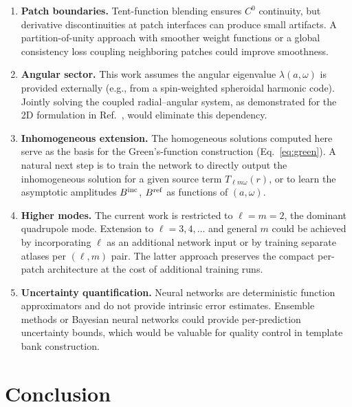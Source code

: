 \documentclass[aps,prd,twocolumn,superscriptaddress,nofootinbib]{revtex4-2}
\begin{document}
\begin{enumerate}
  \item \textbf{Patch boundaries.}  Tent-function blending ensures $C^0$
  continuity, but derivative discontinuities at patch interfaces can produce
  small artifacts.  A partition-of-unity approach with smoother weight functions
  or a global consistency loss coupling neighboring patches could improve
  smoothness.

  \item \textbf{Angular sector.}  This work assumes the angular eigenvalue
  $\lambda(a,\omega)$ is provided externally (e.g., from a spin-weighted
  spheroidal harmonic code).  Jointly solving the coupled radial--angular system,
  as demonstrated for the 2D formulation in Ref.~\cite{Pombo:2025tbyd}, would
  eliminate this dependency.

  \item \textbf{Inhomogeneous extension.}  The homogeneous solutions computed
  here serve as the basis for the Green's-function construction
  (Eq.~\ref{eq:green}).  A natural next step is to train the network to directly
  output the inhomogeneous solution for a given source term $T_{\ell m
  \omega}(r)$, or to learn the asymptotic amplitudes $B^{\rm inc}$, $B^{\rm ref}$
  as functions of $(a,\omega)$.

  \item \textbf{Higher modes.}  The current work is restricted to
  $\ell = m = 2$, the dominant quadrupole mode.  Extension to $\ell = 3, 4,
  \dots$ and general $m$ could be achieved by incorporating $\ell$ as an
  additional network input or by training separate atlases per $(\ell,m)$ pair.
  The latter approach preserves the compact per-patch architecture at the cost of
  additional training runs.

  \item \textbf{Uncertainty quantification.}  Neural networks are deterministic
  function approximators and do not provide intrinsic error estimates.
  Ensemble methods or Bayesian neural networks could provide per-prediction
  uncertainty bounds, which would be valuable for quality control in template
  bank construction.
\end{enumerate}

\section{Conclusion}
\label{sec:conclusion}
\end{document}
